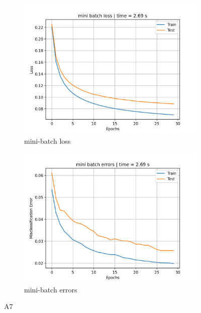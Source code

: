 \documentclass{article}
\begin{document}
\begin{sloppypar}
\begin{aprob}
\begin{enumerate}
\begin{figure}
\begin{subfigure}{0.45\textwidth}
                \end{subfigure}
                \begin{subfigure}{0.45\textwidth}
                    \includegraphics[width=\textwidth]{./img/7-mini-loss.png}
                    \caption{mini-batch loss}
                    \label{fig:miniloss}
                \end{subfigure}
                \hfill
                \begin{subfigure}{0.45\textwidth}
                    \includegraphics[width=\textwidth]{./img/7-mini-errors.png}
                    \caption{mini-batch errors}
                    \label{fig:minierrors}
                \end{subfigure}                        
                \caption{A7}
                \label{fig:a7}
            \end{figure}
    \end{enumerate}
\end{aprob}


\end{sloppypar}
\end{document}
